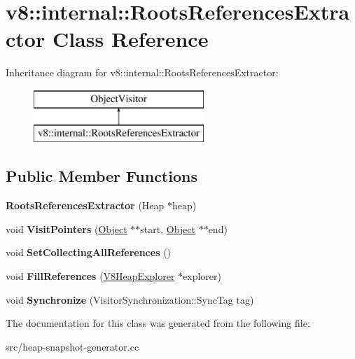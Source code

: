 \hypertarget{classv8_1_1internal_1_1_roots_references_extractor}{}\section{v8\+:\+:internal\+:\+:Roots\+References\+Extractor Class Reference}
\label{classv8_1_1internal_1_1_roots_references_extractor}
Inheritance diagram for v8\+:\+:internal\+:\+:Roots\+References\+Extractor\+:\begin{figure}[H]
\begin{center}
\leavevmode
\includegraphics[height=2.000000cm]{classv8_1_1internal_1_1_roots_references_extractor}
\end{center}
\end{figure}
\subsection*{Public Member Functions}
\begin{DoxyCompactItemize}
\item 
\hypertarget{classv8_1_1internal_1_1_roots_references_extractor_aa308690325e06f682cfb79f3279b7ef6}{}{\bfseries Roots\+References\+Extractor} (Heap $\ast$heap)\label{classv8_1_1internal_1_1_roots_references_extractor_aa308690325e06f682cfb79f3279b7ef6}

\item 
\hypertarget{classv8_1_1internal_1_1_roots_references_extractor_a3a45d8a5c6973046e9e6bfc429e1eb38}{}void {\bfseries Visit\+Pointers} (\hyperlink{classv8_1_1internal_1_1_object}{Object} $\ast$$\ast$start, \hyperlink{classv8_1_1internal_1_1_object}{Object} $\ast$$\ast$end)\label{classv8_1_1internal_1_1_roots_references_extractor_a3a45d8a5c6973046e9e6bfc429e1eb38}

\item 
\hypertarget{classv8_1_1internal_1_1_roots_references_extractor_a4237eeeb566916510350ada117372a89}{}void {\bfseries Set\+Collecting\+All\+References} ()\label{classv8_1_1internal_1_1_roots_references_extractor_a4237eeeb566916510350ada117372a89}

\item 
\hypertarget{classv8_1_1internal_1_1_roots_references_extractor_a004387f9540cabce47f012a85a4ee995}{}void {\bfseries Fill\+References} (\hyperlink{classv8_1_1internal_1_1_v8_heap_explorer}{V8\+Heap\+Explorer} $\ast$explorer)\label{classv8_1_1internal_1_1_roots_references_extractor_a004387f9540cabce47f012a85a4ee995}

\item 
\hypertarget{classv8_1_1internal_1_1_roots_references_extractor_ac6a2fee037807cc263ea6729637bbe07}{}void {\bfseries Synchronize} (Visitor\+Synchronization\+::\+Sync\+Tag tag)\label{classv8_1_1internal_1_1_roots_references_extractor_ac6a2fee037807cc263ea6729637bbe07}

\end{DoxyCompactItemize}


The documentation for this class was generated from the following file\+:\begin{DoxyCompactItemize}
\item 
src/heap-\/snapshot-\/generator.\+cc\end{DoxyCompactItemize}

